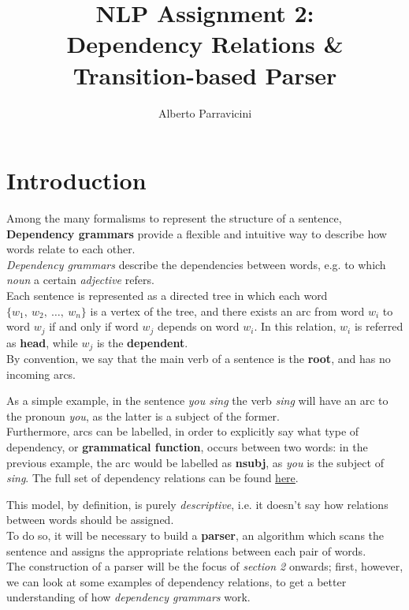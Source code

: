 \documentclass[
12pt,
a4paper,
oneside,
headinclude,
footinclude]{article}
\title{\textbf{NLP Assignment 2: \\ Dependency Relations \&\\
        Transition-based Parser}}
\author{{Alberto Parravicini}}
\date{}	%
\begin{document}
    \maketitle
    \setcounter{page}{1}
    
    \section{Introduction}
    
    Among the many formalisms to represent the structure of a sentence, \textbf{Dependency grammars} provide a flexible and intuitive way to describe how words relate to each other. \\
    \textit{Dependency grammars} describe the dependencies between words, e.g. to which \textit{noun} a certain \textit{adjective} refers.\\
    Each sentence is represented as a directed tree in which each word $\{w_1,\ w_2,\ \ldots,\ w_n\}$ is a vertex of the tree, and there exists an arc from word $w_i$ to word $w_j$ if and only if word $w_j$ depends on word $w_i$. In this relation, $w_i$ is referred as \textbf{head}, while $w_j$ is the \textbf{dependent}.\\
    By convention, we say that the main verb of a sentence is the \textbf{root}, and has no incoming arcs.
    
    As a simple example, in the sentence \textit{you sing} the verb \textit{sing} will have an arc to the pronoun \textit{you}, as the latter is a subject of the former.\\
    Furthermore, arcs can be labelled, in order to explicitly say what type of dependency, or \textbf{grammatical function}, occurs between two words: in the previous example, the arc would be labelled as \textbf{nsubj}, as \textit{you} is the subject of \textit{sing}.
    The full set of dependency relations can be found \href{http://universaldependencies.org/u/dep/index.html}{here}.
    
    This model, by definition, is purely \textit{descriptive}, i.e. it doesn't say how relations between words should be assigned. \\
    To do so, it will be necessary to build a \textbf{parser}, an algorithm which scans the sentence and assigns the appropriate relations between each pair of words.\\
    The construction of a parser will be the focus of \textit{section 2} onwards; first, however, we can look at some examples of dependency relations, to get a better understanding of how \textit{dependency grammars} work.
    
\end{document}

